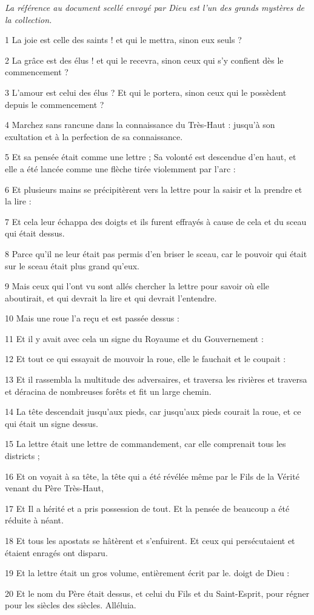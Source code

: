 
\par \textit{La référence au document scellé envoyé par Dieu est l'un des grands mystères de la collection.}

\par 1 La joie est celle des saints ! et qui le mettra, sinon eux seuls ?
\par 2 La grâce est des élus ! et qui le recevra, sinon ceux qui s’y confient dès le commencement ?
\par 3 L'amour est celui des élus ? Et qui le portera, sinon ceux qui le possèdent depuis le commencement ?
\par 4 Marchez sans rancune dans la connaissance du Très-Haut : jusqu'à son exultation et à la perfection de sa connaissance.
\par 5 Et sa pensée était comme une lettre ; Sa volonté est descendue d'en haut, et elle a été lancée comme une flèche tirée violemment par l'arc :
\par 6 Et plusieurs mains se précipitèrent vers la lettre pour la saisir et la prendre et la lire :
\par 7 Et cela leur échappa des doigts et ils furent effrayés à cause de cela et du sceau qui était dessus.
\par 8 Parce qu'il ne leur était pas permis d'en briser le sceau, car le pouvoir qui était sur le sceau était plus grand qu'eux.
\par 9 Mais ceux qui l'ont vu sont allés chercher la lettre pour savoir où elle aboutirait, et qui devrait la lire et qui devrait l'entendre.
\par 10 Mais une roue l'a reçu et est passée dessus :
\par 11 Et il y avait avec cela un signe du Royaume et du Gouvernement :
\par 12 Et tout ce qui essayait de mouvoir la roue, elle le fauchait et le coupait :
\par 13 Et il rassembla la multitude des adversaires, et traversa les rivières et traversa et déracina de nombreuses forêts et fit un large chemin.
\par 14 La tête descendait jusqu'aux pieds, car jusqu'aux pieds courait la roue, et ce qui était un signe dessus.
\par 15 La lettre était une lettre de commandement, car elle comprenait tous les districts ;
\par 16 Et on voyait à sa tête, la tête qui a été révélée même par le Fils de la Vérité venant du Père Très-Haut,
\par 17 Et Il a hérité et a pris possession de tout. Et la pensée de beaucoup a été réduite à néant.
\par 18 Et tous les apostats se hâtèrent et s'enfuirent. Et ceux qui persécutaient et étaient enragés ont disparu.
\par 19 Et la lettre était un gros volume, entièrement écrit par le. doigt de Dieu :
\par 20 Et le nom du Père était dessus, et celui du Fils et du Saint-Esprit, pour régner pour les siècles des siècles. Alléluia.

